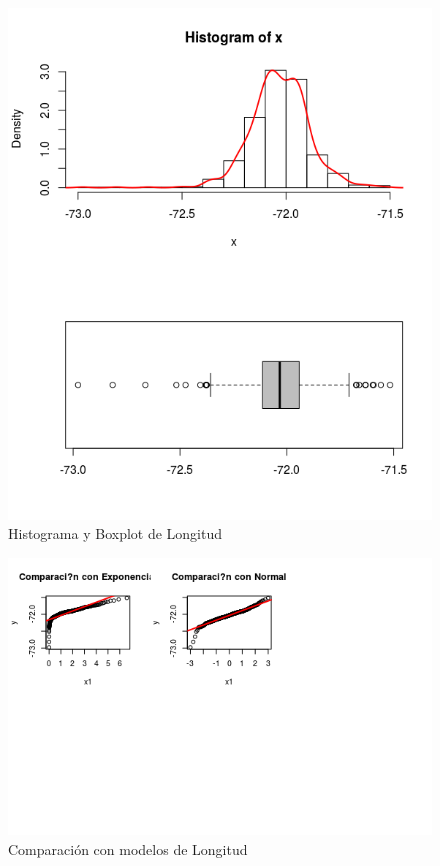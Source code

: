 \documentclass{article}
\begin{document}
\begin{enumerate}[a)]
\begin{figure}[h!]
\centering
\includegraphics[scale=0.5]{./figures/histplot_Longitud.png}
\caption{Histograma y Boxplot de Longitud}
\end{figure}

\begin{figure}[h!]
\centering
\includegraphics[scale=0.5]{./figures/cm_Longitud.png}
\caption{Comparación con modelos de Longitud}
\end{figure}


\end{enumerate}
\end{document}
